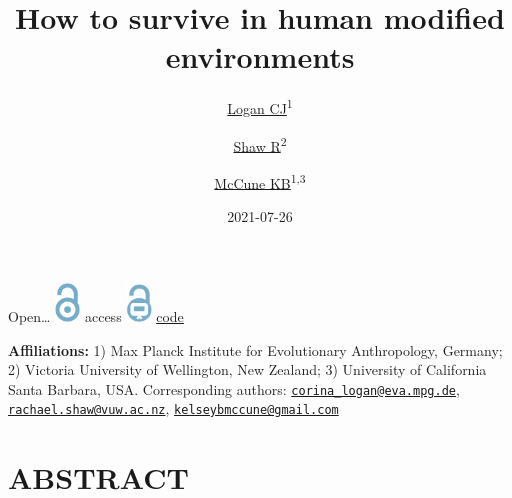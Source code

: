 \documentclass[
]{article}
\title{How to survive in human modified environments}
\author{\href{http://CorinaLogan.com}{Logan
CJ}\textsuperscript{1} \and \href{https://thinkingbehaviour.org}{Shaw
R}\textsuperscript{2} \and \href{https://www.kelseymccune.com/}{McCune
KB}\textsuperscript{1,3}}
\date{2021-07-26}
\begin{document}
\maketitle

\addtolength{\headheight}{0.1cm}
\pagestyle{fancyplain}
\renewcommand{\headrulewidth}{0pt}

Open\ldots{}
\includegraphics[width=0.05\textwidth,height=\textheight]{logoOpenAccess.png}
access
\includegraphics[width=0.05\textwidth,height=\textheight]{logoOpenCode.png}
\href{https://github.com/ManyIndividuals/ManyIndividuals/blob/main/Files/rrs/mi1.Rmd}{code}

\textbf{Affiliations:} 1) Max Planck Institute for Evolutionary
Anthropology, Germany; 2) Victoria University of Wellington, New
Zealand; 3) University of California Santa Barbara, USA. Corresponding
authors:
\href{mailto:corina_logan@eva.mpg.de}{\nolinkurl{corina\_logan@eva.mpg.de}},
\href{mailto:rachael.shaw@vuw.ac.nz}{\nolinkurl{rachael.shaw@vuw.ac.nz}},
\href{mailto:kelseybmccune@gmail.com}{\nolinkurl{kelseybmccune@gmail.com}}

\hypertarget{abstract}{%
\section{ABSTRACT}\label{abstract}}
\end{document}
